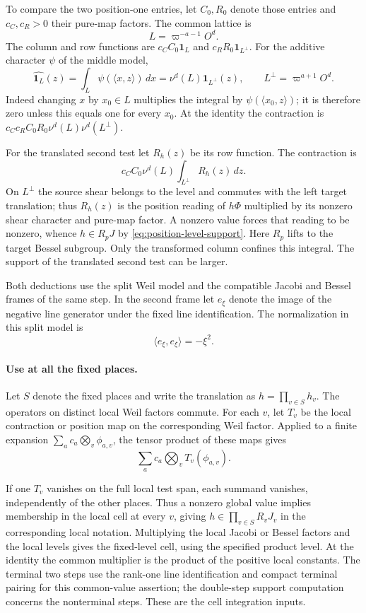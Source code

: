 To compare the two position-one entries, let \(C_0,R_0\) denote those entries and \(c_C,c_R>0\) their pure-map factors. The common lattice is
\[
 L=\varpi^{-a-1}O^d .
\] The column and row functions are
\(c_C C_0\mathbf1_L\) and \(c_R R_0\mathbf1_{L^\perp}\).
For the additive character \(\psi\) of the middle model,
\[
 \widehat{\mathbf1_L}(z)=\int_L\psi(\langle x,z\rangle)\,dx
             =\nu^d(L)\mathbf1_{L^\perp}(z),
 \qquad L^\perp=\varpi^{a+1}O^d.
\]
Indeed changing \(x\) by \(x_0\in L\) multiplies the integral
by \(\psi(\langle x_0,z\rangle)\); it is therefore zero unless
this equals one for every \(x_0\). At the identity the
contraction is \(c_Cc_R C_0R_0\nu^d(L)\nu^d(L^\perp)\).

For the translated second test let \(R_h(z)\) be its row
function. The contraction is
\[
 c_C C_0\nu^d(L)\int_{L^\perp}R_h(z)\,dz .
\]
On \(L^\perp\) the source shear belongs to the level and
commutes with the left target translation; thus \(R_h(z)\)
is the position reading of \(h\Phi\) multiplied by its
nonzero shear character and pure-map factor. A nonzero value
forces that reading to be nonzero, whence \(h\in R_pJ\) by
\eqref{eq:position-level-support}. Here \(R_p\) lifts to the
target Bessel subgroup. Only the transformed column confines
this integral. The support of the translated second test can
be larger.

Both deductions use the split Weil
model and the compatible Jacobi and Bessel frames of
the same step. In the second frame let \(e_\xi\) denote the image of the
negative line generator under the fixed line identification. The
normalization in this split model is
\[
 \langle e_\xi,e_\xi\rangle=-\xi^2 .
\]
\label{cor:period-level-support-2}

\paragraph{Use at all the fixed places.}
Let \(S\) denote the fixed places and write the translation
as \(h=\prod_{v\in S} h_v\). The operators on distinct local
Weil factors commute. For each \(v\), let \(T_v\) be the local contraction or position map on the corresponding Weil factor. Applied to a finite expansion \(\sum_a c_a\bigotimes_v\phi_{a,v}\), the tensor product of these maps gives
\[
  \sum_a c_a\bigotimes_v T_v(\phi_{a,v}).
\]

If one \(T_v\) vanishes on the full local test span, each summand
vanishes, independently of the other places.
Thus a nonzero global value implies membership in the local cell at every \(v\), giving
\(h\in\prod_{v\in S} R_vJ_v\) in the corresponding local
notation. Multiplying the local Jacobi or Bessel factors
and the local levels gives the fixed-level cell, using the
specified product level. At the identity the common
multiplier is the product of the positive local constants.
The terminal two steps use the rank-one line identification
and compact terminal pairing for this common-value assertion;
the double-step support computation concerns the
nonterminal steps. These are the cell integration inputs.


\label{cor:period-level-support-3}
